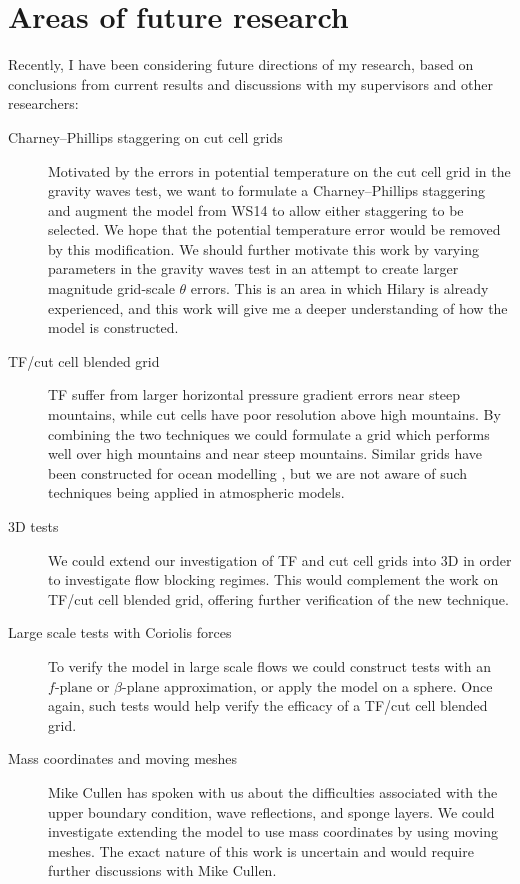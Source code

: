 \documentclass[a4paper]{article}
\begin{document}
\section{Areas of future research}
Recently, I have been considering future directions of my research, based on conclusions from current results and discussions with my supervisors and other researchers:
\begin{description}
	\item[Charney--Phillips staggering on cut cell grids]{Motivated by the errors in potential temperature on the cut cell grid in the gravity waves test, we want to formulate a Charney--Phillips staggering and augment the model from WS14 to allow either staggering to be selected.  We hope that the potential temperature error would be removed by this modification.  We should further motivate this work by varying parameters in the gravity waves test in an attempt to create larger magnitude grid-scale $\theta$ errors.  This is an area in which Hilary is already experienced, and this work will give me a deeper understanding of how the model is constructed.}

	\item[TF/cut cell blended grid]{TF suffer from larger horizontal pressure gradient errors near steep mountains, while cut cells have poor resolution above high mountains.  By combining the two techniques we could formulate a grid which performs well over high mountains and near steep mountains.  Similar grids have been constructed for ocean modelling \citep{burchard-petersen1997,barron2006}, but we are not aware of such techniques being applied in atmospheric models.} 
	\item[3D tests]{We could extend our investigation of TF and cut cell grids into 3D in order to investigate flow blocking regimes.  This would complement the work on TF/cut cell blended grid, offering further verification of the new technique.}

	\item[Large scale tests with Coriolis forces]{To verify the model in large scale flows we could construct tests with an $f\text{-plane}$ or $\beta$-plane approximation, or apply the model on a sphere.  Once again, such tests would help verify the efficacy of a TF/cut cell blended grid.}

	\item[Mass coordinates and moving meshes]{Mike Cullen has spoken with us about the difficulties associated with the upper boundary condition, wave reflections, and sponge layers.  We could investigate extending the model to use mass coordinates by using moving meshes.  The exact nature of this work is uncertain and would require further discussions with Mike Cullen.}


\end{description}
\end{document}

